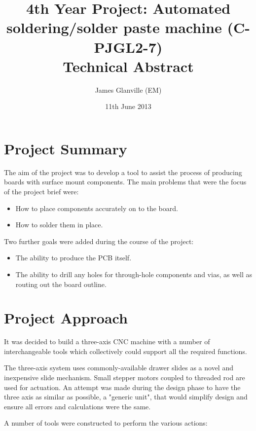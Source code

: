 \documentclass[a4paper,11pt]{article}  %
\title{4th Year Project: Automated soldering/solder paste machine (C-PJGL2-7) \\ Technical Abstract} %
\author{James Glanville (EM)}
\date{11th June 2013}
\begin{document}
\maketitle



\section*{Project Summary}
The aim of the project was to develop a tool to assist the process of 
producing boards with surface mount components. The main problems that
were the focus of the project brief were:

\begin{itemize}\itemsep0em
\item
How to place components accurately on to the board.
\item
How to solder them in place.
\end{itemize}

Two further goals were added during the course of the project:

\begin{itemize}\itemsep0em
\item
The ability to produce the PCB itself.
\item
The ability to drill any holes for through-hole components and vias, as
well as routing out the board outline.
\end{itemize}

\section*{Project Approach}
It was decided to build a three-axis CNC machine with a number of interchangeable
tools which collectively could support all the required functions.

The three-axis system uses commonly-available drawer slides as a novel
and inexpensive slide mechanism. Small stepper motors coupled to threaded
rod are used for actuation. An attempt was made during the design phase
to have the three axis as similar as possible, a "generic unit", that would
simplify design and ensure all errors and calculations were the same.

A number of tools were constructed to perform the various actions:
\end{document}

